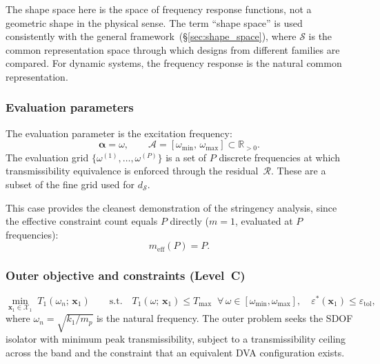 \begin{remark}
The shape space here is the space of frequency response functions, not a geometric shape in the physical sense. The term ``shape space'' is used consistently with the general framework~(\S\ref{sec:shape_space}), where $\mathcal{S}$ is the common representation space through which designs from different families are compared. For dynamic systems, the frequency response is the natural common representation.
\end{remark}


\subsubsection{Evaluation parameters}

The evaluation parameter is the excitation frequency:
\begin{equation}
    \boldsymbol{\alpha} = \omega, \qquad
    \mathcal{A} = [\omega_{\min},\, \omega_{\max}] \subset \mathbb{R}_{>0}.
\end{equation}
The evaluation grid $\{\omega^{(1)}, \ldots, \omega^{(P)}\}$ is a set of $P$ discrete frequencies at which transmissibility equivalence is enforced through the residual~$\mathcal{R}$. These are a subset of the fine grid used for $d_{\mathcal{S}}$.

This case provides the cleanest demonstration of the stringency analysis, since the effective constraint count equals $P$ directly ($m = 1$, evaluated at $P$ frequencies):
\begin{equation}
    m_{\mathrm{eff}}(P) = P.
\end{equation}


\subsubsection{Outer objective and constraints (Level~C)}

\begin{equation}
    \min_{\mathbf{x}_1 \in \mathcal{X}_1}\; T_1(\omega_n;\, \mathbf{x}_1)
    \qquad \text{s.t.} \quad
    T_1(\omega;\, \mathbf{x}_1) \leq T_{\max} \;\; \forall\, \omega \in [\omega_{\min}, \omega_{\max}],
    \quad \varepsilon^*(\mathbf{x}_1) \leq \varepsilon_{\mathrm{tol}},
    \label{eq:vibration_outer}
\end{equation}
where $\omega_n = \sqrt{k_1/m_p}$ is the natural frequency. The outer problem seeks the SDOF isolator with minimum peak transmissibility, subject to a transmissibility ceiling across the band and the constraint that an equivalent DVA configuration exists.



